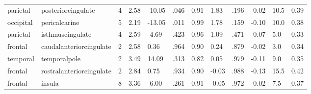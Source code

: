 \documentclass{article}
\begin{document}
\begin{longtable}{llR{1.5cm}R{1cm}R{1.3cm}R{1cm}R{1cm}R{1.3cm}R{1cm}R{1.8cm}R{1.3cm}R{1.8cm}}
  parietal &        posteriorcingulate &            4 &                  2.58 &           -10.05 &               .046 &                               0.91 &                          1.83 &                            .196 & -0.02 &   10.5 &      0.39 \\
 occipital &             pericalcarine &            5 &                  2.19 &           -13.05 &               .011 &                               0.99 &                          1.78 &                            .159 & -0.10 &   10.0 &      0.38 \\
  parietal &          isthmuscingulate &            4 &                  2.59 &            -4.69 &               .423 &                               0.96 &                          1.09 &                            .471 & -0.07 &    5.0 &      0.33 \\
   frontal &   caudalanteriorcingulate &            2 &                  2.58 &             0.36 &               .964 &                               0.90 &                          0.24 &                            .879 & -0.02 &    3.0 &      0.34 \\
  temporal &              temporalpole &            2 &                  3.49 &            14.09 &               .313 &                               0.82 &                          0.05 &                            .979 & -0.11 &    9.0 &      0.35 \\
   frontal &  rostralanteriorcingulate &            2 &                  2.84 &             0.75 &               .934 &                               0.90 &                         -0.03 &                            .988 & -0.13 &   15.5 &      0.42 \\
   frontal &                    insula &            8 &                  3.36 &            -6.00 &               .261 &                               0.91 &                         -0.05 &                            .972 & -0.02 &    7.5 &      0.37 \\
\end{longtable}
\end{document}
